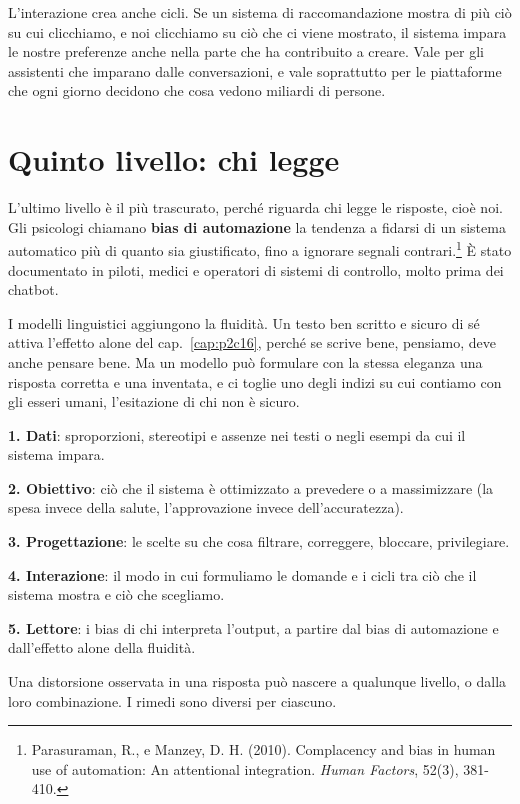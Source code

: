 L'interazione crea anche cicli. Se un sistema di raccomandazione mostra di più ciò su cui clicchiamo, e noi clicchiamo su ciò che ci viene mostrato, il sistema impara le nostre preferenze anche nella parte che ha contribuito a creare. Vale per gli assistenti che imparano dalle conversazioni, e vale soprattutto per le piattaforme che ogni giorno decidono che cosa vedono miliardi di persone.

\section{Quinto livello: chi legge}

L'ultimo livello è il più trascurato, perché riguarda chi legge le risposte, cioè noi. Gli psicologi chiamano \textbf{bias di automazione} la tendenza a fidarsi di un sistema automatico più di quanto sia giustificato, fino a ignorare segnali contrari.\footnote{Parasuraman, R., e Manzey, D. H. (2010). Complacency and bias in human use of automation: An attentional integration. \textit{Human Factors}, 52(3), 381-410.} È stato documentato in piloti, medici e operatori di sistemi di controllo, molto prima dei chatbot.

I modelli linguistici aggiungono la fluidità. Un testo ben scritto e sicuro di sé attiva l'effetto alone del cap.~\ref{cap:p2c16}, perché se scrive bene, pensiamo, deve anche pensare bene. Ma un modello può formulare con la stessa eleganza una risposta corretta e una inventata, e ci toglie uno degli indizi su cui contiamo con gli esseri umani, l'esitazione di chi non è sicuro.

\begin{concetto}
\textbf{1. Dati}: sproporzioni, stereotipi e assenze nei testi o negli esempi da cui il sistema impara.

\textbf{2. Obiettivo}: ciò che il sistema è ottimizzato a prevedere o a massimizzare (la spesa invece della salute, l'approvazione invece dell'accuratezza).

\textbf{3. Progettazione}: le scelte su che cosa filtrare, correggere, bloccare, privilegiare.

\textbf{4. Interazione}: il modo in cui formuliamo le domande e i cicli tra ciò che il sistema mostra e ciò che scegliamo.

\textbf{5. Lettore}: i bias di chi interpreta l'output, a partire dal bias di automazione e dall'effetto alone della fluidità.

\smallskip
\noindent Una distorsione osservata in una risposta può nascere a qualunque livello, o dalla loro combinazione. I rimedi sono diversi per ciascuno.
\end{concetto}


